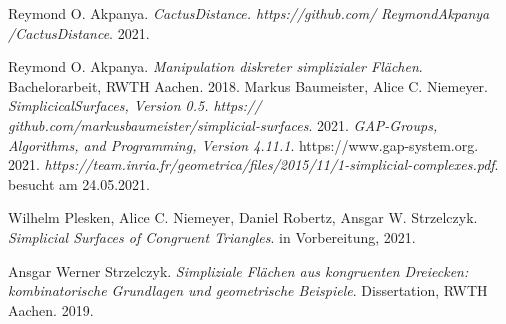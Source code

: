 \documentclass[12pt,titlepage,twoside,cleardoublepage]{article}
\theoremstyle{nummermitklammern}
\newtheorem{lemma}[temp]{Lemma}
\newtheorem{bsp}[temp]{Beispiel}
\newtheorem{bemerkung}[temp]{Bemerkung}
\newtheorem{lemma}[zahl]{Lemma}
\newtheorem{bsp}[zahl]{Beispiel}
\newtheorem{bemerkung}[zahl]{Bemerkung}
\numberwithin{equation}{section}
\DeclareMathOperator{\Aut}{Aut}
\begin{document}

\newpage
\begin{thebibliography}{9}
 Reymond O. Akpanya.
  \textit{CactusDistance.
 https://github.com/} \textit{ReymondAkpanya /CactusDistance}. 2021.

 Reymond O. Akpanya. \textit{Manipulation diskreter simplizialer Flächen}. Bachelorarbeit, RWTH Aachen. 2018.
Markus Baumeister, Alice C. Niemeyer. \textit{SimplicicalSurfaces, Version 0.5.
 https://} \textit{github.com/markusbaumeister/simplicial-surfaces}. 2021.
 \textit{GAP-Groups, Algorithms, and Programming, Version 4.11.1}. https://www.gap-system.org. 2021.
	\textit{https://team.inria.fr/geometrica/files/2015/11/1-simplicial-complexes.pdf}. besucht am 24.05.2021.

Wilhelm Plesken, Alice C. Niemeyer, Daniel Robertz, Ansgar W. Strzelczyk.
\textit{Simplicial Surfaces of Congruent Triangles}.
in Vorbereitung, 2021.

 Ansgar Werner Strzelczyk.
 \textit{ {{S}impliziale {F}lächen aus kongruenten {D}reiecken: kombinatorische {G}rundlagen und geometrische {B}eispiele}}. Dissertation, RWTH Aachen. 2019.

\end{thebibliography}
\end{document}
